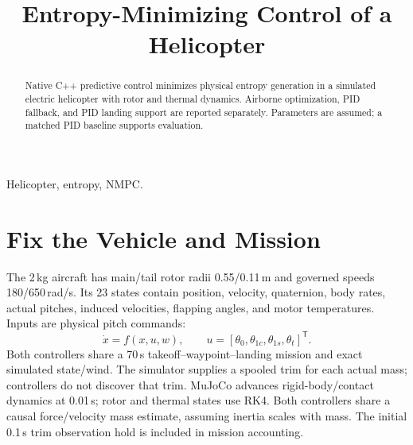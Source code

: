 
\title{Entropy-Minimizing Control of a Helicopter}
\author{
}
\date{}

\maketitle
\begin{abstract}
Native C++ predictive control minimizes physical entropy generation in a
simulated electric helicopter with rotor and thermal dynamics. Airborne
optimization, PID fallback, and PID landing support are reported separately.
Parameters are assumed; a matched PID baseline supports evaluation.
\end{abstract}
\begin{IEEEkeywords}
Helicopter, entropy, NMPC.
\end{IEEEkeywords}
\balance
\section{Fix the Vehicle and Mission}
The 2\,kg aircraft has main/tail rotor radii 0.55/0.11\,m and governed
speeds 180/650\,rad/s. Its 23 states contain
position, velocity, quaternion, body rates, actual pitches, induced velocities,
flapping angles, and motor temperatures. Inputs are physical pitch commands:
\begin{equation}
\dot x=f(x,u,w),\qquad
u=[\theta_0,\theta_{1c},\theta_{1s},\theta_t]^{\mathsf T}.
\end{equation}
Both controllers share a 70\,s takeoff--waypoint--landing mission
and exact simulated state/wind. The simulator supplies a spooled trim for each
actual mass; controllers do not discover that trim. MuJoCo advances rigid-body/contact dynamics
at 0.01\,s; rotor and thermal states use RK4. Both controllers share a causal
force/velocity mass estimate, assuming inertia scales with mass. The initial
0.1\,s trim observation hold is included in mission accounting.

